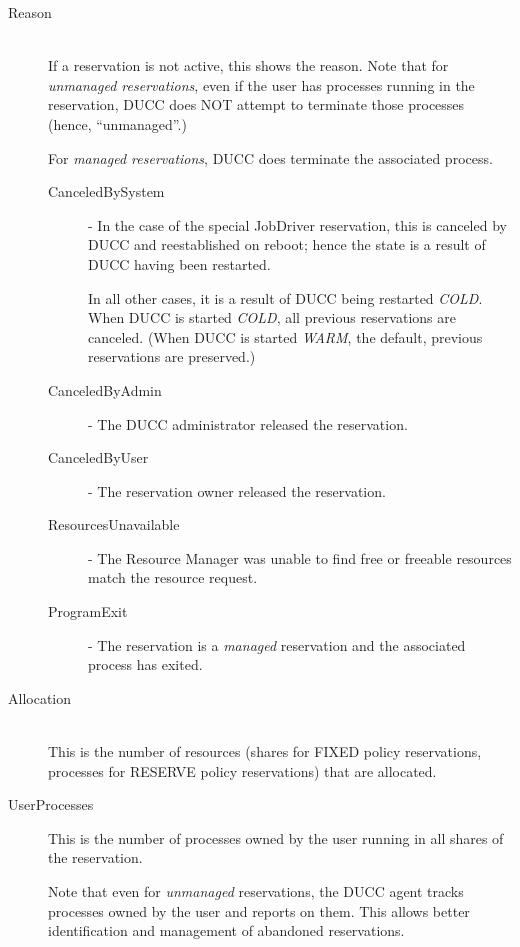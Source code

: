 \begin{description}
\item[Reason] \hfill \\


  If a reservation is not active, this shows the reason.  Note that for
  {\em unmanaged reservations}, even if the user has processes running in the
  reservation, DUCC does NOT attempt to terminate those processes (hence, ``unmanaged''.)

  For {\em managed reservations}, DUCC does terminate the associated process.

  \begin{description}
  \item[CanceledBySystem] - In the case of the special JobDriver reservation, this is
    canceled by DUCC and reestablished on reboot; hence the state is a result of DUCC
    having been restarted.

    In all other cases, it is a result of DUCC being restarted {\em COLD}.  When
    DUCC is started {\em COLD}, all previous reservations are canceled.  (When DUCC
    is started {\em WARM}, the default, previous reservations are preserved.)
  \item[CanceledByAdmin] - The DUCC administrator released the reservation. 
  \item[CanceledByUser] - The reservation owner released the reservation. 
  \item[ResourcesUnavailable] - The Resource Manager was unable to find free or freeable resources 
    match the resource request. 
  \item[ProgramExit] - The reservation is a {\em managed} reservation and the associated
    process has exited.
  \end{description}

\item[Allocation] \hfill \\
  This is the number of resources (shares for FIXED policy reservations, processes for
  RESERVE policy reservations) that are allocated.

\item[UserProcesses] This is the number of processes owned by the user running in all
  shares of the reservation.  
  
  Note that even for {\em unmanaged} reservations, the DUCC agent tracks processes owned
  by the user and reports on them.  This allows better identification and management of
  abandoned reservations.


\end{description}
